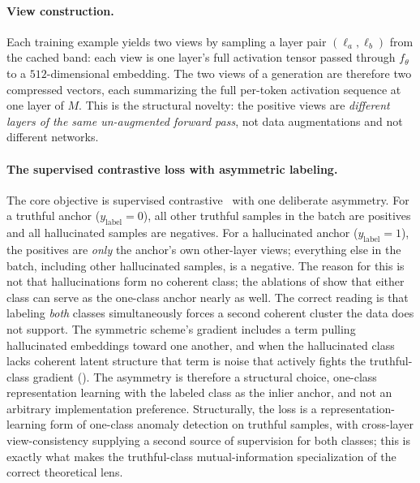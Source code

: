 \paragraph{View construction.}
Each training example yields two views by sampling a layer pair
$(\ell_a, \ell_b)$ from the cached band: each view is one layer's full activation
tensor passed through $f_\theta$ to a $512$-dimensional embedding. The two views
of a generation are therefore two compressed vectors, each summarizing the full
per-token activation sequence at one layer of $M$. This is the structural
novelty: the positive views are \emph{different layers of the same un-augmented
forward pass}, not data augmentations and not different networks.

\paragraph{The supervised contrastive loss with asymmetric labeling.}
The core objective is supervised contrastive~\citep{khosla2020supervised} with
one deliberate asymmetry. For a truthful anchor ($y_{\mathrm{label}} = 0$), all
other truthful samples in the batch are positives and all hallucinated samples
are negatives. For a hallucinated anchor ($y_{\mathrm{label}} = 1$), the
positives are \emph{only} the anchor's own other-layer views; everything else in
the batch, including other hallucinated samples, is a negative. The reason for
this is not that hallucinations form no coherent class; the ablations of
 show that either class can serve as the one-class anchor
nearly as well. The correct reading is that labeling \emph{both} classes
simultaneously forces a second coherent cluster the data does not support. The
symmetric scheme's gradient includes a term pulling hallucinated embeddings
toward one another, and when the hallucinated class lacks coherent latent
structure that term is noise that actively fights the truthful-class gradient
(). The asymmetry is therefore a structural choice, one-class
representation learning with the labeled class as the inlier anchor, and not an
arbitrary implementation preference. Structurally, the loss is a
representation-learning form of one-class anomaly detection on truthful samples,
with cross-layer view-consistency supplying a second source of supervision for
both classes; this is exactly what makes the truthful-class mutual-information
specialization of  the correct theoretical lens.

